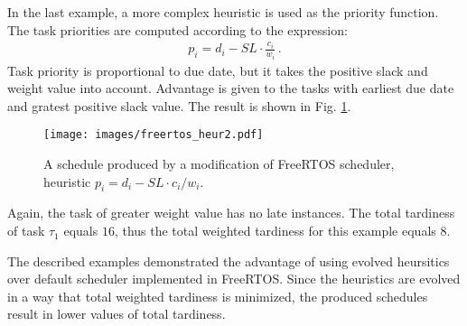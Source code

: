 In the last example, a more complex heuristic is used as the priority function.
The task priorities are computed according to the expression:
\begin{align*}
p_i = d_i - SL \cdot \frac{c_i}{w_i} \, .
\end{align*}
Task priority is proportional to due date, but it takes the positive slack and weight value into account.
Advantage is given to the tasks with earliest due date and gratest positive slack value.
The result is shown in Fig. \ref{freertos_2}.
\begin{figure}[ht]
    \centering
    \texttt{[image: images/freertos\_heur2.pdf]}
    \caption{A schedule produced by a modification of FreeRTOS scheduler, heuristic $p_i = d_i - SL \cdot c_i / w_i$.}
    \label{freertos_2}
\end{figure}
Again, the task of greater weight value has no late instances.
The total tardiness of task $\tau_1$ equals $16$, thus the total weighted tardiness for this example equals $8$.

The described examples demonstrated the advantage of using evolved heursitics over default scheduler implemented in FreeRTOS.
Since the heuristics are evolved in a way that total weighted tardiness is minimized, the produced schedules result in lower values of total tardiness.
